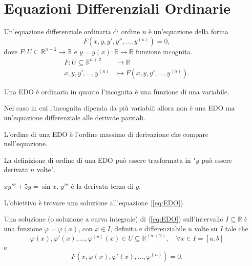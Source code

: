 \section{Equazioni Differenziali Ordinarie}
\begin{definition}
    Un'equazione differenziale ordinaria di ordine $n$ è un'equazione della forma
    \begin{equation}\label{eq:EDO}
        F(x,y,y', y'', \hdots, y^{(n)})=0,
    \end{equation}
    dove $F\colon U\subseteq\mathbb R^{n+2}\rightarrow\mathbb R$ e $y=y(x)\colon\mathbb R\rightarrow\mathbb R$ funzione incognita.
    \begin{align*}
        F\colon U\subseteq\mathbb R^{n+2} & \rightarrow\mathbb R\\
        x,y,y',\hdots, y^{(n)} & \mapsto F(x,y,y', \hdots, y^{(n)}).
    \end{align*}
\end{definition}

\begin{definition}
    Una EDO è ordinaria in quanto l'incognita è una funzione di una variabile.
\end{definition}

Nel caso in cui l'incognita dipenda da più variabili allora non è una EDO ma un'equazione differenziale alle derivate parziali.

\begin{definition}
    L'ordine di una EDO è l'ordine massimo di derivazione che compare nell'equazione.
\end{definition}

La definizione di ordine di una EDO può essere trasformata in "$y$ può essere derivata $n$ volte".

\begin{example}
    $xy'''+5y=\sin x$. $y'''$ è la derivata terza di $y$.
\end{example}

L'obiettivo è trovare una soluzione all'equazione (\ref{eq:EDO}).

\begin{definition}\label{def:curva_integrale_EDO}
    Una soluzione (o soluzione a curva integrale) di (\ref{eq:EDO}) sull'intervallo $I\subseteq\mathbb R$ è una funzione $\varphi=\varphi(x)$, con $x\in I$, definita e differenziabile $n$ volte su $I$ tale che
    \begin{equation*}
        \varphi(x),\varphi'(x),\hdots,\varphi^{(n)}(x)\in U\subseteq\mathbb R^{(n+2)},\quad \forall x\in I=[a,b]
    \end{equation*}
    e
    \begin{equation*}
        F(x,\varphi(x),\varphi'(x),\hdots,\varphi^{(n)})=0.
    \end{equation*}
\end{definition}

